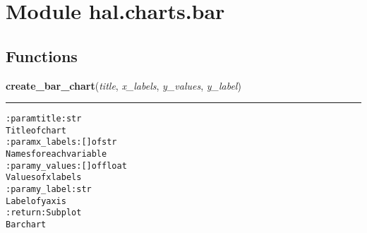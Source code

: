 %
%
%


\section{Module hal.charts.bar}

    \label{hal:charts:bar}


  \subsection{Functions}

    \label{hal:charts:bar:create_bar_chart}

    \vspace{0.5ex}

\hspace{.8\funcindent}\begin{boxedminipage}{\funcwidth}

    \raggedright \textbf{create\_bar\_chart}(\textit{title}, \textit{x\_labels}, \textit{y\_values}, \textit{y\_label})

    \vspace{-1.5ex}

    \rule{\textwidth}{0.5\fboxrule}
\setlength{\parskip}{2ex}
\begin{alltt}

:param title: str
    Title of chart
:param x\_labels: [] of str
    Names for each variable
:param y\_values: [] of float
    Values of x labels
:param y\_label: str
    Label of y axis
:return: Subplot
    Bar chart
\end{alltt}

\setlength{\parskip}{1ex}
    \end{boxedminipage}


